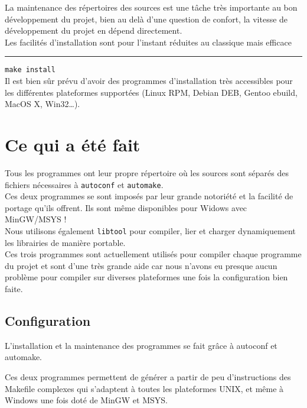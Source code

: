 \documentclass[14pt,a4paper]{report}
\begin{document}
La maintenance des r\'epertoires des sources est une t\^ache tr\`es
importante au bon d\'eveloppement du projet, bien au del\`a d'une
question de confort, la vitesse de d\'eveloppement du projet en
d\'epend directement. \\

Les facilit\'es d'installation sont pour l'instant r\'eduites au
classique mais efficace \\
\rule{1cm}{0cm}
{\tt make install} \\

Il est bien s\^ur pr\'evu d'avoir des programmes d'installation tr\`es
accessibles pour les diff\'erentes plateformes support\'ees
(Linux RPM, Debian DEB, Gentoo ebuild, MacOS X, Win32\ldots).
\\

\section{Ce qui a \'et\'e fait}

Tous les programmes ont leur propre r\'epertoire o\`u les sources
sont s\'epar\'es des fichiers n\'ecessaires \`a {\tt autoconf} et
{\tt automake}.\\

Ces deux programmes se sont impos\'es par leur grande notori\'et\'e
et la facilit\'e de portage qu'ils offrent. Ils sont m\^eme disponibles
pour Widows avec MinGW/MSYS ! \\

Nous utilisons \'egalement {\tt libtool} pour compiler, lier et
charger dynamiquement les librairies de mani\`ere portable. \\

Ces trois programmes sont actuellement utilis\'es pour
compiler chaque programme du projet et sont d'une tr\`es grande
aide car nous n'avons eu presque aucun probl\`eme pour compiler sur
diverses plateformes une fois la configuration bien faite. \\


\newpage

\subsection{Configuration}

L'installation et la maintenance des programmes se fait gr\^ace \`a 
autoconf et automake.

Ces deux programmes permettent de g\'en\'erer a partir de peu d'instructions
des Makefile complexes qui s'adaptent \`a toutes les plateformes UNIX,
et m\^eme \`a Windows une fois dot\'e de MinGW et MSYS.\\
\end{document}
